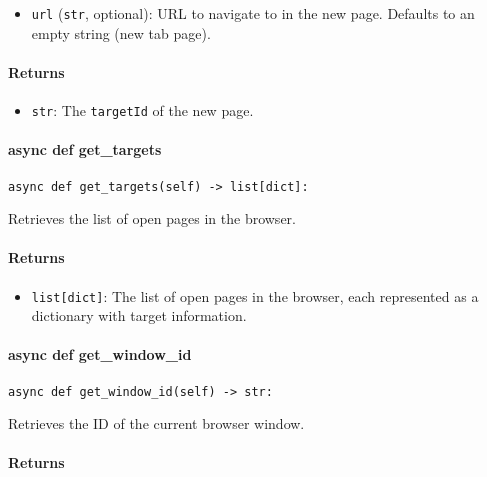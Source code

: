 \documentclass{article}
\begin{document}
\begin{itemize}
    \item \lstinline[style=pythonstyle]|url| (\lstinline[style=pythonstyle]|str|, optional): URL to navigate to in the new page. Defaults to an empty string (new tab page).
\end{itemize}

\paragraph{Returns}

\begin{itemize}
    \item \lstinline[style=pythonstyle]|str|: The \lstinline[style=pythonstyle]|targetId| of the new page.
\end{itemize}

\paragraph{async def get\_targets}

\begin{lstlisting}[style=pythonstyle]
async def get_targets(self) -> list[dict]:
\end{lstlisting}

\noindent Retrieves the list of open pages in the browser.

\paragraph{Returns}

\begin{itemize}
    \item \lstinline[style=pythonstyle]|list[dict]|: The list of open pages in the browser, each represented as a dictionary with target information.
\end{itemize}

\paragraph{async def get\_window\_id}

\begin{lstlisting}[style=pythonstyle]
async def get_window_id(self) -> str:
\end{lstlisting}

\noindent Retrieves the ID of the current browser window.

\paragraph{Returns}
\end{document}
